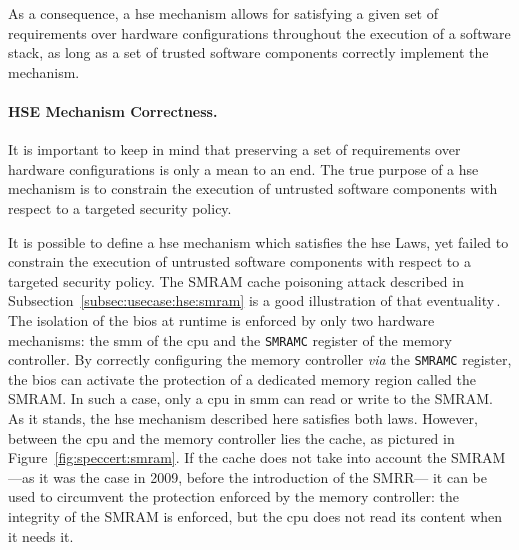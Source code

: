 As a consequence, a \ac{hse} mechanism allows for satisfying a given
set of requirements over hardware configurations throughout the execution of
a software stack, as long as a set of trusted software components correctly
implement the mechanism.

\paragraph{HSE Mechanism Correctness.}
%
It is important to keep in mind that preserving a set of requirements over
hardware configurations is only a mean to an end.
%
The true purpose of a \ac{hse} mechanism is to constrain the execution of
untrusted software components with respect to a targeted security policy.

It is possible to define a \ac{hse} mechanism which satisfies the \ac{hse} Laws,
yet failed to constrain the execution of untrusted software components with
respect to a targeted security policy.
%
The SMRAM cache poisoning attack described in
Subsection~\ref{subsec:usecase:hse:smram} is a good illustration of that
eventuality\,\cite{duflot2009smram,wojtczuk2009smram}.
%
The isolation of the \ac{bios} at runtime is enforced by only two hardware
mechanisms: the \ac{smm} of the \ac{cpu} and the \texttt{SMRAMC} register of the
memory controller.
%
By correctly configuring the memory controller \emph{via} the \texttt{SMRAMC}
register, the \ac{bios} can activate the protection of a dedicated memory region
called the SMRAM.
%
In such a case, only a \ac{cpu} in \ac{smm} can read or write to the SMRAM.
%
As it stands, the \ac{hse} mechanism described here satisfies both laws.
%
However, between the \ac{cpu} and the memory controller lies the cache, as
pictured in Figure~\ref{fig:speccert:smram}.
%
If the cache does not take into account the SMRAM ---as it was the case in 2009,
before the introduction of the SMRR--- it can be used to circumvent the
protection enforced by the memory controller: the integrity of the SMRAM is
enforced, but the \ac{cpu} does not read its content when it needs it.

